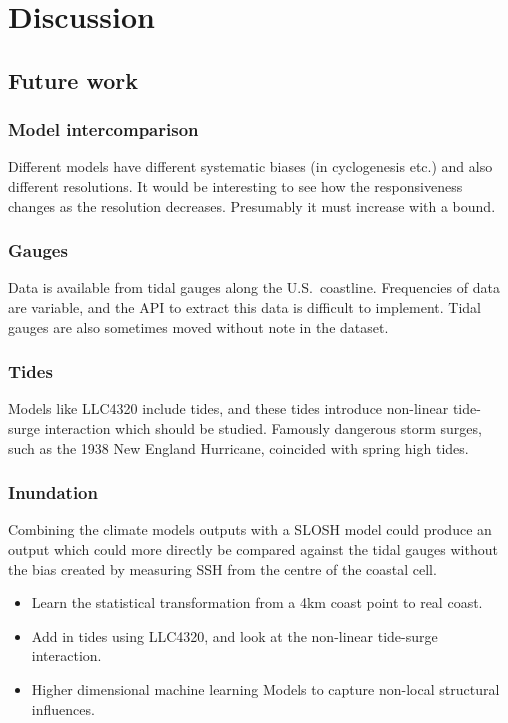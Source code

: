 \section{Discussion}
\label{sec:7_Discussion}

\subsection{Future work}
\subsubsection{Model intercomparison}
Different models have different systematic biases (in cyclogenesis etc.)
and also different resolutions. It would be interesting to see how
the responsiveness changes as the resolution decreases.
Presumably it must increase with a bound.

\subsubsection{Gauges}
Data is available from tidal gauges along the U.S.~coastline.
Frequencies of data are variable, and the API to extract this data
is difficult to implement. Tidal gauges are also sometimes moved
without note in the dataset.

\subsubsection{Tides}
Models like LLC4320 include tides, and these tides introduce
non-linear tide-surge interaction which should be studied.
Famously dangerous storm surges, such as the 1938 New England
Hurricane, coincided with spring high tides.

\subsubsection{Inundation}
Combining the climate models outputs with a SLOSH model could produce
an output which could more directly be compared against the tidal gauges
without the bias created by measuring SSH from the centre of the coastal
cell.


\begin{itemize}
\item Learn the statistical transformation from
      a 4km coast point to real coast.
\item Add in tides using LLC4320, and look at the
      non-linear tide-surge interaction.
\item Higher dimensional machine learning Models
      to capture non-local structural influences.
\end{itemize}

